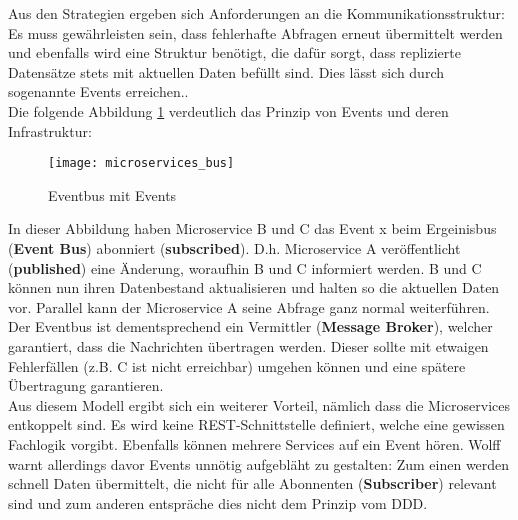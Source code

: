 Aus den Strategien ergeben sich Anforderungen an die Kommunikationsstruktur: Es muss gewährleisten sein, dass fehlerhafte Abfragen erneut übermittelt werden und ebenfalls wird eine Struktur benötigt, die dafür sorgt, dass replizierte Datensätze stets mit aktuellen Daten befüllt sind. Dies lässt sich durch sogenannte Events erreichen.\cite{bruce2019mic_in_action}.\cite{wolff2018mic_praxis}  \\

Die folgende Abbildung \ref{fig:microservices_bus} verdeutlich das Prinzip von Events und deren Infrastruktur: 

\begin{figure}[ht]
	\centering
	\texttt{[image: microservices\_bus]}
	\caption[Eventbus mit Events] { Eventbus mit Events\cite{cesardelatorre2018azure}}
	\label{fig:microservices_bus}
\end{figure}

In dieser Abbildung haben Microservice B und C das Event x beim Ergeinisbus (\textbf{Event Bus}) abonniert (\textbf{subscribed}). D.h. Microservice A veröffentlicht (\textbf{published}) eine Änderung, woraufhin B und C informiert werden. B und C können nun ihren Datenbestand aktualisieren und halten so die aktuellen Daten vor. Parallel kann der Microservice A seine Abfrage ganz normal weiterführen. Der Eventbus ist dementsprechend ein Vermittler (\textbf{Message Broker}), welcher garantiert, dass die Nachrichten übertragen werden. Dieser sollte mit etwaigen Fehlerfällen (z.B. C ist nicht erreichbar) umgehen können und eine spätere Übertragung garantieren. \cite{cesardelatorre2018azure}\cite{wolff2018mic_praxis} \\

Aus diesem Modell ergibt sich ein weiterer Vorteil, nämlich dass die Microservices entkoppelt sind. Es wird keine REST-Schnittstelle definiert, welche eine gewissen Fachlogik vorgibt. Ebenfalls können mehrere Services auf ein Event hören. Wolff warnt allerdings davor Events unnötig aufgebläht zu gestalten: Zum einen werden schnell Daten übermittelt, die nicht für alle Abonnenten (\textbf{Subscriber}) relevant sind und zum anderen entspräche dies nicht dem Prinzip vom DDD. \\


